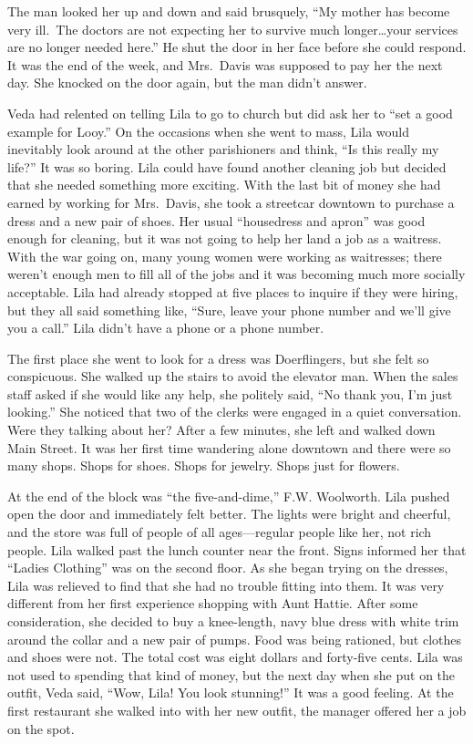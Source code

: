 \documentclass[
  american,
  letterpaper,
]{book}
\begin{document}
The man looked her up and down and said brusquely, ``My mother has
become very ill.~The doctors are not expecting her to survive much
longer\ldots your services are no longer needed here.'' He shut the door
in her face before she could respond. It was the end of the week, and
Mrs.~Davis was supposed to pay her the next day. She knocked on the door
again, but the man didn't answer.

Veda had relented on telling Lila to go to church but did ask her to
``set a good example for Looy.'' On the occasions when she went to mass,
Lila would inevitably look around at the other parishioners and think,
``Is this really my life?'' It was so boring. Lila could have found
another cleaning job but decided that she needed something more
exciting. With the last bit of money she had earned by working for
Mrs.~Davis, she took a streetcar downtown to purchase a dress and a new
pair of shoes. Her usual ``housedress and apron'' was good enough for
cleaning, but it was not going to help her land a job as a waitress.
With the war going on, many young women were working as waitresses;
there weren't enough men to fill all of the jobs and it was becoming
much more socially acceptable. Lila had already stopped at five places
to inquire if they were hiring, but they all said something like,
``Sure, leave your phone number and we'll give you a call.'' Lila didn't
have a phone or a phone number.

The first place she went to look for a dress was Doerflingers, but she
felt so conspicuous. She walked up the stairs to avoid the elevator man.
When the sales staff asked if she would like any help, she politely
said, ``No thank you, I'm just looking.'' She noticed that two of the
clerks were engaged in a quiet conversation. Were they talking about
her? After a few minutes, she left and walked down Main Street. It was
her first time wandering alone downtown and there were so many shops.
Shops for shoes. Shops for jewelry. Shops just for flowers.

At the end of the block was ``the five-and-dime,'' F.W. Woolworth. Lila
pushed open the door and immediately felt better. The lights were bright
and cheerful, and the store was full of people of all ages---regular
people like her, not rich people. Lila walked past the lunch counter
near the front. Signs informed her that ``Ladies Clothing'' was on the
second floor. As she began trying on the dresses, Lila was relieved to
find that she had no trouble fitting into them. It was very different
from her first experience shopping with Aunt Hattie. After some
consideration, she decided to buy a knee-length, navy blue dress with
white trim around the collar and a new pair of pumps. Food was being
rationed, but clothes and shoes were not. The total cost was eight
dollars and forty-five cents. Lila was not used to spending that kind of
money, but the next day when she put on the outfit, Veda said, ``Wow,
Lila! You look stunning!'' It was a good feeling. At the first
restaurant she walked into with her new outfit, the manager offered her
a job on the spot.
\end{document}
